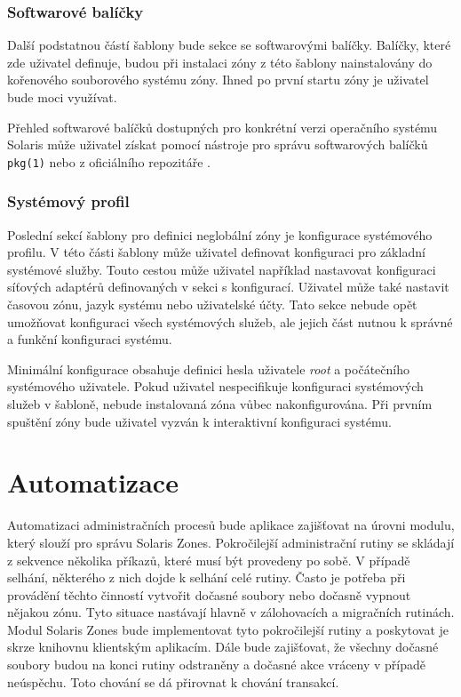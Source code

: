 \subsubsection{Softwarové balíčky}
\label{chapter:design:templates:zones:manifest}
Další podstatnou částí šablony bude sekce se softwarovými balíčky. Balíčky, které zde uživatel definuje, budou při instalaci
zóny z této šablony nainstalovány do kořenového souborového systému zóny. Ihned po první startu zóny je uživatel bude moci
využívat.

Přehled softwarové balíčků dostupných pro konkrétní verzi operačního systému Solaris může uživatel získat pomocí nástroje
pro správu softwarových balíčků \verb|pkg(1)| nebo z oficiálního repozitáře \cite{oracle:solaris:desing:pkg_repository}.
\subsubsection{Systémový profil}
\label{chapter:design:templates:zones:profile}
Poslední sekcí šablony pro definici neglobální zóny je konfigurace systémového profilu. V této části šablony může uživatel
definovat konfiguraci pro základní systémové služby. Touto cestou může uživatel například nastavovat konfiguraci síťových
adaptérů definovaných v sekci s konfigurací. Uživatel může také nastavit časovou zónu, jazyk systému nebo uživatelské účty.
Tato sekce nebude opět umožňovat konfiguraci všech systémových služeb, ale jejich část nutnou k správné a funkční konfiguraci
systému.

Minimální konfigurace obsahuje definici hesla uživatele \textit{root} a počátečního systémového uživatele. Pokud uživatel
nespecifikuje konfiguraci systémových služeb v šabloně, nebude instalovaná zóna vůbec nakonfigurována. Při prvním spuštění
zóny bude uživatel vyzván k interaktivní konfiguraci systému.
\section{Automatizace}
\label{chapter:design:automation}
Automatizaci administračních procesů bude aplikace zajišťovat na úrovni modulu, který slouží pro správu Solaris Zones. Pokročilejší
administrační rutiny se skládají z sekvence několika příkazů, které musí být provedeny po sobě. V případě selhání, některého
z nich dojde k selhání celé rutiny. Často je potřeba při provádění těchto činností vytvořit dočasné soubory nebo dočasně 
vypnout nějakou zónu. Tyto situace nastávají hlavně v zálohovacích a migračních rutinách. Modul Solaris Zones bude implementovat
tyto pokročilejší rutiny a poskytovat je skrze knihovnu klientským aplikacím. Dále bude zajišťovat, že všechny dočasné soubory
budou na konci rutiny odstraněny a dočasné akce vráceny v případě neúspěchu. Toto chování se dá přirovnat k chování transakcí.

